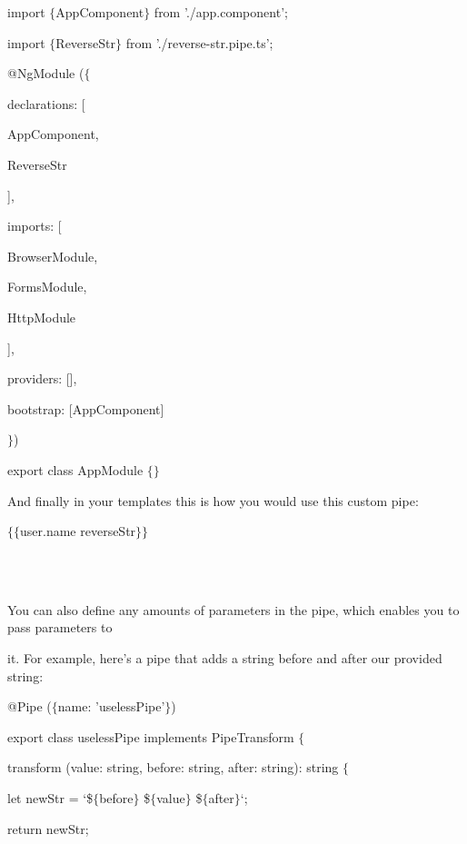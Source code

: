\documentclass{article}
\begin{document}
\noindent 

\noindent import $\mathrm{\{}$AppComponent$\mathrm{\}}$ from './app.component'; 

\noindent import $\mathrm{\{}$ReverseStr$\mathrm{\}}$ from './reverse-str.pipe.ts';

\noindent 

\noindent 

\noindent @NgModule ($\mathrm{\{}$

declarations: [

AppComponent, 

ReverseStr

\noindent ],

\noindent imports: [ 

BrowserModule, 

FormsModule, 

HttpModule

\noindent ],

  providers: [],

 bootstrap: [AppComponent]

\noindent $\mathrm{\}}$)

\noindent export class AppModule $\mathrm{\{}$$\mathrm{\}}$

\noindent 

\noindent And finally in your templates this is how you would use this custom pipe:

\noindent $\mathrm{\{}$$\mathrm{\{}$user.name {\textbar} reverseStr$\mathrm{\}}$$\mathrm{\}}$

\noindent 
\\ \\
\newpage
{}

\noindent You can also define any amounts of parameters in the pipe, which enables you to pass parameters to

\noindent it. For example, here's a pipe that adds a string before and after our provided string:

\noindent @Pipe ($\mathrm{\{}$name: 'uselessPipe'$\mathrm{\}}$)

 export class uselessPipe implements PipeTransform $\mathrm{\{}$

  transform (value: string, before: string, after: string): string $\mathrm{\{}$

  let newStr = `\$$\mathrm{\{}$before$\mathrm{\}}$ \$$\mathrm{\{}$value$\mathrm{\}}$ \$$\mathrm{\{}$after$\mathrm{\}}$`;

  return newStr;
\end{document}
